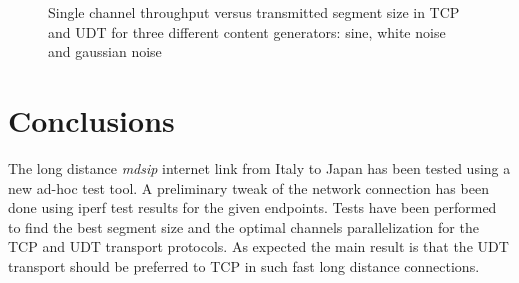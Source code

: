 \documentclass[10pt,a4paper]{article}
\begin{document}
\begin{figure}[ht]
\centerline{
}
\caption[]
{ Single channel throughput versus transmitted segment size in TCP and UDT for three different content generators: sine, white noise and gaussian noise }
\label{fig:content}
\end{figure}



\section{Conclusions}

The long distance \emph{mdsip} internet link from Italy to Japan has been tested using a new ad-hoc test tool.
A preliminary tweak of the network connection has been done using iperf test results for the given endpoints.
Tests have been performed to find the best segment size and the optimal channels parallelization for the TCP and UDT transport protocols.
As expected the main result is that the UDT transport should be preferred to TCP in such fast long distance connections.
\end{document}
